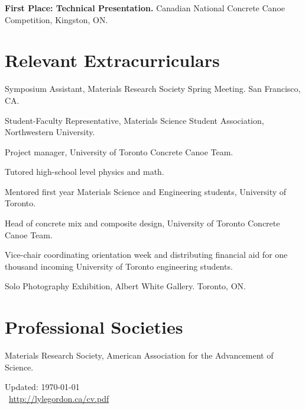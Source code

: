 \textbf{First Place: Technical Presentation.} Canadian National Concrete Canoe Competition, Kingston, ON.
\endgroup

\section*{Relevant Extracurriculars}
Symposium Assistant, Materials Research Society Spring Meeting. San Francisco, CA.

\begingroup\setlength{\parskip}{0.1cm}
Student-Faculty Representative, Materials Science Student Association, Northwestern University.

Project manager, University of Toronto Concrete Canoe Team.

Tutored high-school level physics and math.

Mentored first year Materials Science and Engineering students, University of Toronto.

Head of concrete mix and composite design, University of Toronto Concrete Canoe Team.

Vice-chair coordinating orientation week and distributing financial aid for one thousand incoming University of Toronto engineering students.

Solo Photography Exhibition, Albert White Gallery. Toronto, ON.
\endgroup

\section*{Professional Societies}
Materials Research Society, American Association for the Advancement of Science.

\begin{center}
\vfill
{\scriptsize Updated: \today\\\
\href{http://lylegordon.ca/cv.pdf}{http://lylegordon.ca/cv.pdf}}
\end{center}